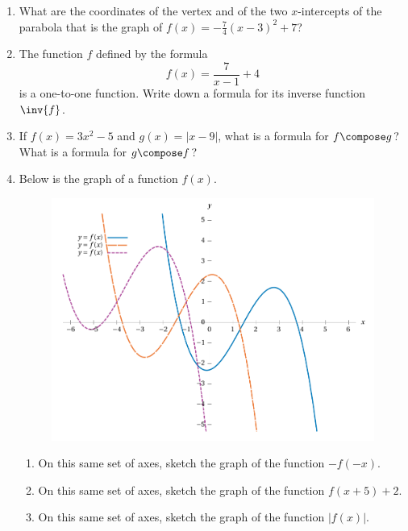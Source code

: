 \begin{enumerate}

    \item 
        What are the coordinates of the vertex
        and of the two \(x\)-intercepts of the parabola
        that is the graph of \(f(x) = -\frac{7}{4}(x-3)^2+7 \)?
        \vfill\null
        \vfill\null

    \item 
        The function \(f\) defined by the formula
        \[f(x) = \frac{7}{x-1}+4\]
        is a one-to-one function.
        Write down a formula for its inverse function \(\inv{f}\).
        \vfill\null
        \vfill\null

    \item 
        If \(f(x) = 3x^2-5\) and \(g(x) = |x-9|\),
        what is a formula for \(f \compose g\)?
        What is a formula for \(g \compose f\)?
        \vfill\null

        \newpage

    \item 
        Below is the graph of a function \(f(x)\).
        \begin{figure}[h]
            \centering\includegraphics[width=\textwidth]{figures/transform/main.pdf}
        \end{figure}
        \begin{enumerate}
            \item 
                On this same set of axes, 
                sketch the graph of the function \(-f(-x)\).
                \vfill\null
            \item 
                On this same set of axes, 
                sketch the graph of the function \(f(x+5)+2\).
                \vfill\null
            \item 
                On this same set of axes, 
                sketch the graph of the function \(|f(x)|\).
                \vfill\null
        \end{enumerate}

\end{enumerate}



